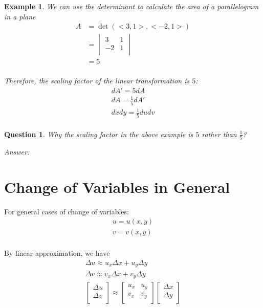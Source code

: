 \documentclass{article}
\newtheorem{example}{Example}
\newtheorem*{question}{Question}
\begin{document}
\begin{example}
  We can use the determinant to calculate the area of a parallelogram in a plane
  \begin{equation*}
    \begin{split}
      A &= \det(<3, 1>, <-2, 1>) \\
        &= \begin{vmatrix}
             3 & 1 \\
             -2 & 1 \\ 
           \end{vmatrix} \\
        &= 5 \\
    \end{split}
  \end{equation*}

  Therefore, the scaling factor of the linear transformation is $5$:
  \begin{gather*}
    dA' = 5dA \\
    dA = \frac{1}{5} dA' \\
    dx dy = \frac{1}{5} du dv \\
  \end{gather*}

\end{example}

\begin{question}
  Why the scaling factor in the above example is $5$ rather than $\frac{1}{5}$?

  Answer:
\end{question}

\section{Change of Variables in General}

For general cases of change of variables:
\begin{gather*}
  u = u(x, y) \\
  v = v(x, y) \\
\end{gather*}

By linear approximation, we have
\begin{gather*}
  \Delta u \approx u_x \Delta x + u_y \Delta y \\
  \Delta v \approx v_x \Delta x + v_y \Delta y \\
  \begin{bmatrix}
    \Delta u \\
    \Delta v \\
  \end{bmatrix} \approx 
  \begin{bmatrix}
    u_x & u_y \\
    v_x & v_y \\
  \end{bmatrix}
  \begin{bmatrix}
    \Delta x \\
    \Delta y \\
  \end{bmatrix} \\
\end{gather*}
\end{document}
